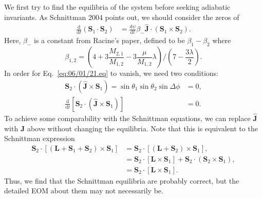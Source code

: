 \documentclass[11pt,
        usenames, %
        dvipsnames %
    ]{article}
\newcommand*{\rd}[2]{\frac{\mathrm{d}#1}{\mathrm{d}#2}}
\newcommand*{\bm}[1]{\boldsymbol{\mathbf{#1}}}
\newcommand*{\uv}[1]{\hat{\bm{#1}}}
\newcommand*{\p}[1]{\left(#1\right)}
\newcommand*{\s}[1]{\left[#1\right]}
\begin{document}
We first try to find the equilibria of the system before seeking adiabatic
invariants. As Schnittman 2004 points out, we should consider the zeros of
\begin{align}
    \rd{}{t}\p{\bm{S}_1 \cdot \bm{S}_2}
        &= \rd{\psi}{t} \beta_- \uv{J} \cdot \p{\bm{S}_1 \times \bm{S}_2}.
        \label{eq:06/01/21.eq}
\end{align}
Here, $\beta_-$ is a constant from Racine's paper, defined to be $\beta_1 -
\beta_2$ where
\begin{equation}
    \beta_{1,2} = \p{4 + 3\frac{M_{2, 1}}{M_{1, 2}}
        - 3\frac{\mu}{M_{1, 2}}\lambda}\Bigg/\p{7 - \frac{3\lambda}{2}}.
\end{equation}
In order for Eq.~\eqref{eq:06/01/21.eq} to vanish, we need two conditions:
\begin{align}
    \bm{S}_2 \cdot \p{\uv{J} \times \bm{S}_1} =
        \sin \theta_1 \sin \theta_2 \sin \Delta \phi &= 0,\\
    \rd{}{t}\s{\bm{S}_2 \cdot \p{\uv{J} \times \bm{S}_1}}
        &= 0.
\end{align}
To achieve some comparability with the Schnittman equations, we can replace
$\uv{J}$ with $\bm{J}$ above without changing the equilibria. Note that this
is equivalent to the Schnittman expression
\begin{align}
    \bm{S}_2 \cdot \s{\p{\bm{L} + \bm{S}_1 + \bm{S}_2} \times \bm{S}_1}
        &= \bm{S}_2 \cdot \s{\p{\bm{L} + \bm{S}_2} \times \bm{S}_1},\\
        &= \bm{S}_2 \cdot \s{\bm{L} \times \bm{S}_1}
            + \bm{S}_2 \cdot \p{\bm{S}_2 \times \bm{S}_1},\\
        &= \bm{S}_2 \cdot \s{\bm{L} \times \bm{S}_1}.
\end{align}
Thus, we find that the Schnittman equilibria are probably correct, but the
detailed EOM about them may not necessarily be.
\end{document}
